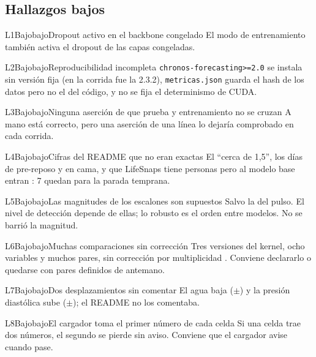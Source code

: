 \subsection{Hallazgos bajos}

\begin{hallazgo}{L1}{Bajo}{bajo}{Dropout activo en el backbone congelado}
El modo de entrenamiento también activa el dropout de las capas congeladas.
\end{hallazgo}
\begin{hallazgo}{L2}{Bajo}{bajo}{Reproducibilidad incompleta}
\texttt{chronos-forecasting>=2.0} se instala sin versión fija (en la corrida fue la 2.3.2), \texttt{metricas.json}
guarda el hash de los datos pero no el del código, y no se fija el determinismo de CUDA.
\end{hallazgo}
\begin{hallazgo}{L3}{Bajo}{bajo}{Ninguna aserción de que prueba y entrenamiento no se cruzan}
A mano está correcto, pero una aserción de una línea lo dejaría comprobado en cada corrida.
\end{hallazgo}
\begin{hallazgo}{L4}{Bajo}{bajo}{Cifras del README que no eran exactas}
El \enquote{cerca de 1,5\pct}, los días de pre-reposo y en cama, y que LifeSnaps tiene 
personas pero al modelo base entran : 7 quedan para la parada temprana.
\end{hallazgo}
\begin{hallazgo}{L5}{Bajo}{bajo}{Las magnitudes de los escalones son supuestos}
Salvo la del pulso. El nivel de detección depende de ellas; lo robusto es el orden entre modelos. No se barrió la
magnitud.
\end{hallazgo}
\begin{hallazgo}{L6}{Bajo}{bajo}{Muchas comparaciones sin corrección}
Tres versiones del kernel, ocho variables y muchos pares, sin corrección por multiplicidad \parencite{benjamini1995}.
Conviene declararlo o quedarse con pares definidos de antemano.
\end{hallazgo}
\begin{hallazgo}{L7}{Bajo}{bajo}{Dos desplazamientos sin comentar}
El agua baja  ($\pm$) y la presión diastólica sube
 ($\pm$); el README no los comentaba.
\end{hallazgo}
\begin{hallazgo}{L8}{Bajo}{bajo}{El cargador toma el primer número de cada celda}
Si una celda trae dos números, el segundo se pierde sin aviso. Conviene que el cargador avise cuando pase.
\end{hallazgo}

